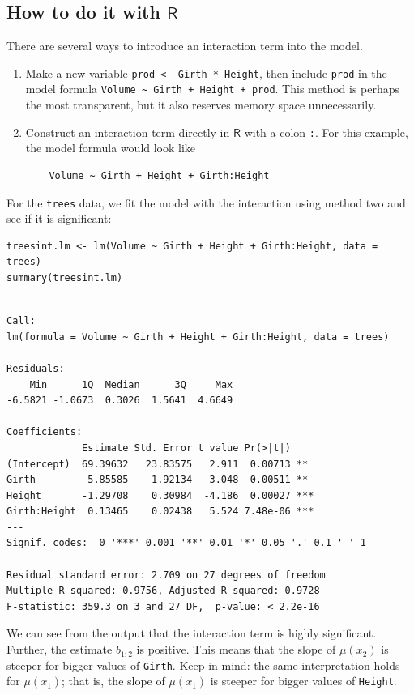 \documentclass[captions=tableheading]{scrbook}
\begin{document}
\subsection{How to do it with \(\mathsf{R}\)}
\label{sec-12-5-2}


There are several ways to introduce an interaction term into the model.
\begin{enumerate}
\item Make a new variable \texttt{prod <- Girth * Height}, then include \texttt{prod} in the model formula \texttt{Volume \textasciitilde{} Girth + Height + prod}. This method is perhaps the most transparent, but it also reserves memory space unnecessarily.
\item Construct an interaction term directly in \(\mathsf{R}\) with a colon \texttt{:}. For this example, the model formula would look like 
\begin{verbatim}
    Volume ~ Girth + Height + Girth:Height
\end{verbatim}
\end{enumerate}

For the \texttt{trees} data, we fit the model with the interaction using method two and see if it is significant:


\begin{verbatim}
treesint.lm <- lm(Volume ~ Girth + Height + Girth:Height, data = trees)
summary(treesint.lm)
\end{verbatim}


\begin{verbatim}

Call:
lm(formula = Volume ~ Girth + Height + Girth:Height, data = trees)

Residuals:
    Min      1Q  Median      3Q     Max 
-6.5821 -1.0673  0.3026  1.5641  4.6649 

Coefficients:
             Estimate Std. Error t value Pr(>|t|)    
(Intercept)  69.39632   23.83575   2.911  0.00713 ** 
Girth        -5.85585    1.92134  -3.048  0.00511 ** 
Height       -1.29708    0.30984  -4.186  0.00027 ***
Girth:Height  0.13465    0.02438   5.524 7.48e-06 ***
---
Signif. codes:  0 '***' 0.001 '**' 0.01 '*' 0.05 '.' 0.1 ' ' 1 

Residual standard error: 2.709 on 27 degrees of freedom
Multiple R-squared: 0.9756,	Adjusted R-squared: 0.9728 
F-statistic: 359.3 on 3 and 27 DF,  p-value: < 2.2e-16
\end{verbatim}

We can see from the output that the interaction term is highly significant. Further, the estimate \(b_{1:2}\) is positive. This means that the slope of \(\mu(x_{2})\) is steeper for bigger values of \texttt{Girth}. Keep in mind: the same interpretation holds for \(\mu(x_{1})\); that is, the slope of \(\mu(x_{1})\) is steeper for bigger values of \texttt{Height}.
\end{document}
